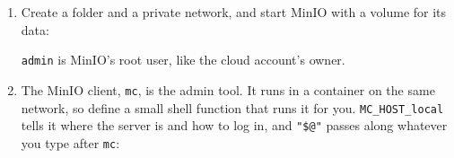 \begin{enumerate}
\def\labelenumi{\arabic{enumi}.}
\item
  Create a folder and a private network, and start MinIO with a volume for its data:

  \begin{codeblock}

\begin{Shaded}
\begin{Highlighting}[]
 \KeywordTok{\&\&} 
 \DataTypeTok{\textbackslash{}}
  \DataTypeTok{\textbackslash{}}
  \DataTypeTok{\textbackslash{}}
\end{Highlighting}
\end{Shaded}

  \end{codeblock}

  \texttt{admin} is MinIO's root user, like the cloud account's owner.
\item
  The MinIO client, \texttt{mc}, is the admin tool. It runs in a container on the same network, so define a small shell function that runs it for you. \texttt{MC\_HOST\_local} tells it where the server is and how to log in, and \texttt{"\$@"} passes along whatever you type after \texttt{mc}:

  \begin{codeblock}

\begin{Shaded}
\begin{Highlighting}[]
 \KeywordTok{\{}
    \DataTypeTok{\textbackslash{}}
    \DataTypeTok{\textbackslash{}}
\KeywordTok{\}}
\end{Highlighting}
\end{Shaded}


\end{codeblock}
\end{enumerate}
